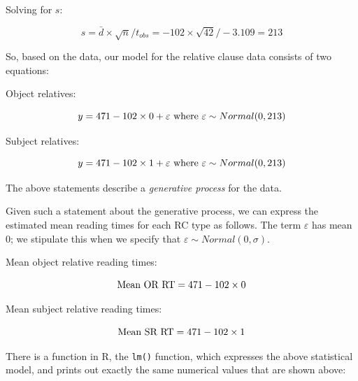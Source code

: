 \documentclass[
  12pt,
]{krantz}
\newenvironment{Shaded}{\begin{snugshade}}{\end{snugshade}}
\newcommand{\FunctionTok}[1]{\textcolor[rgb]{0.00,0.00,0.00}{#1}}
\newcommand{\NormalTok}[1]{#1}
\newcommand{\OtherTok}[1]{\textcolor[rgb]{0.56,0.35,0.01}{#1}}
\newcommand{\SpecialCharTok}[1]{\textcolor[rgb]{0.00,0.00,0.00}{#1}}
\theoremstyle{definition}
\theoremstyle{definition}
\theoremstyle{definition}
\theoremstyle{definition}
\theoremstyle{remark}
\begin{document}
Solving for \(s\):

\begin{equation}
 s = \bar{d} \times \sqrt{n}/t_{obs} = -102 \times \sqrt{42}/-3.109  =  213
\end{equation}

So, based on the data, our model for the relative clause data consists of two equations:

Object relatives:

\begin{equation}
y = 471 -102\times 0 + \varepsilon \hfill \hbox{ where } \varepsilon \sim Normal(0,213)
\end{equation}

Subject relatives:

\begin{equation}
y = 471 - 102\times 1 + \varepsilon \hbox{ where } \varepsilon \sim Normal(0,213)
\end{equation}

The above statements describe a \emph{generative process} for the data.

Given such a statement about the generative process, we can express the estimated mean reading times for each RC type as follows. The term \(\varepsilon\) has mean 0; we stipulate this when we specify that \(\varepsilon \sim Normal(0,\sigma)\).

Mean object relative reading times:

\begin{equation}
\hbox{Mean OR RT}= 471 -102\times 0
\end{equation}

Mean subject relative reading times:

\begin{equation}
\hbox{Mean SR RT} = 471 - 102\times 1 
\end{equation}

There is a function in R, the \texttt{lm()} function, which expresses the above statistical model, and prints out exactly the same numerical values that are shown above:

\begin{Shaded}
\end{Shaded}
\end{document}
